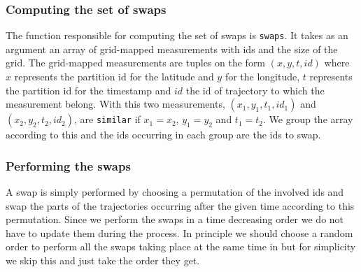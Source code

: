 \documentclass[11pt]{article}
\begin{document}
\subsubsection{Computing the set of swaps}
\label{sec:org8f3a699}
The function responsible for computing the set of swaps is \texttt{swaps}. It
takes as an argument an array of grid-mapped measurements with ids and
the size of the grid. The grid-mapped measurements are tuples on the
form \((x, y, t, id)\) where \(x\) represents the partition id for the
latitude and \(y\) for the longitude, \(t\) represents the partition
id for the timestamp and \(id\) the id of trajectory to which the
measurement belong. With this two measurements, \((x_1, y_1, t_1,
id_1)\) and \((x_2, y_2, t_2, id_2)\), are \texttt{similar} if \(x_1 = x_2\),
\(y_1 = y_2\) and \(t_1 = t_2\). We group the array according to this
and the ids occurring in each group are the ids to swap.
\subsubsection{Performing the swaps}
\label{sec:org1578af5}
A swap is simply performed by choosing a permutation of the involved
ids and swap the parts of the trajectories occurring after the given
time according to this permutation. Since we perform the swaps in a
time decreasing order we do not have to update them during the
process. In principle we should choose a random order to perform all
the swaps taking place at the same time in but for simplicity we skip
this and just take the order they get.
\end{document}
